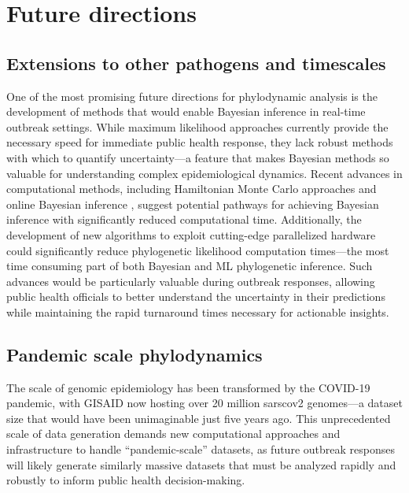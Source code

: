 \section{Future directions}
\subsection{Extensions to other pathogens and timescales}
One of the most promising future directions for phylodynamic analysis is the development of methods that would enable Bayesian inference in real-time outbreak settings.
While maximum likelihood approaches currently provide the necessary speed for immediate public health response, they lack robust methods with which to quantify uncertainty---a feature that makes Bayesian methods so valuable for understanding complex epidemiological dynamics.
Recent advances in computational methods, including Hamiltonian Monte Carlo approaches \citep{baele2020hamiltonian,ji2023scalable} and online Bayesian inference \citep{gill2020online,dinh2018online}, suggest potential pathways for achieving Bayesian inference with significantly reduced computational time.
Additionally, the development of new algorithms to exploit cutting-edge parallelized hardware could significantly reduce phylogenetic likelihood computation times---the most time consuming part of both Bayesian and ML phylogenetic inference.
Such advances would be particularly valuable during outbreak responses, allowing public health officials to better understand the uncertainty in their predictions while maintaining the rapid turnaround times necessary for actionable insights.

\subsection{Pandemic scale phylodynamics}
The scale of genomic epidemiology has been transformed by the COVID-19 pandemic, with GISAID now hosting over 20 million \gls{sarscov2} genomes---a dataset size that would have been unimaginable just five years ago.
This unprecedented scale of data generation demands new computational approaches and infrastructure to handle ``pandemic-scale'' datasets, as future outbreak responses will likely generate similarly massive datasets that must be analyzed rapidly and robustly to inform public health decision-making.


